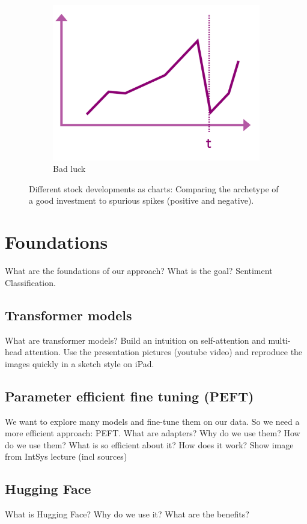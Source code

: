 \documentclass[conference]{IEEEtran}
\begin{document}
\begin{figure}[h!]
\begin{subfigure}{.33\linewidth}
        \centering
        \includegraphics[width=\linewidth]{../5. report/pictures/preproccessing3.png}
        \caption{Bad luck}
        \label{fig:preprocessing3}
    \end{subfigure}
    \caption{Different stock developments as charts: Comparing the archetype of a good investment to spurious spikes (positive and negative). }
    \label{fig:preprocessing}
\end{figure}

\section{Foundations} %
What are the foundations of our approach? What is the goal? Sentiment Classification.
\subsection{Transformer models}%
What are transformer models? 
Build an intuition on self-attention and multi-head attention. 
Use the presentation pictures (youtube video) and reproduce the images quickly in a sketch style on iPad.
\subsection{Parameter efficient fine tuning (PEFT)}%
We want to explore many models and fine-tune them on our data. So we need a more efficient approach: PEFT.
What are adapters? Why do we use them? How do we use them?
What is so efficient about it? How does it work?
Show image from IntSys lecture (incl sources)
\subsection{Hugging Face}%
What is Hugging Face? Why do we use it? What are the benefits?
\end{document}
